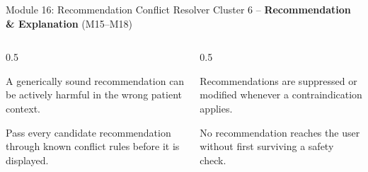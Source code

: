 \documentclass[9pt,aspectratio=169]{beamer}
\begin{document}
\begin{frame}{Module 16: Recommendation Conflict Resolver}
\textcolor{black!55}{\scriptsize Cluster 6 -- \textcolor{green!60!black}{\textbf{Recommendation \& Explanation}} (M15--M18)}\\[2pt]
\begin{columns}[T,onlytextwidth]
\begin{column}{0.5\textwidth}
\begin{tcolorbox}[colback=blue!7,colframe=blue!55!black,title=\textbf{Motivation},boxrule=0.6pt,arc=1mm,left=5pt,right=5pt,top=3pt,bottom=3pt,fonttitle=\small]
\footnotesize A generically sound recommendation can be actively harmful in the wrong patient context.
\end{tcolorbox}
\vspace{5pt}
\begin{tcolorbox}[colback=teal!7,colframe=teal!55!black,title=\textbf{Method},boxrule=0.6pt,arc=1mm,left=5pt,right=5pt,top=3pt,bottom=3pt,fonttitle=\small]
\footnotesize Pass every candidate recommendation through known conflict rules before it is displayed.
\end{tcolorbox}
\end{column}
\begin{column}{0.5\textwidth}
\begin{tcolorbox}[colback=green!8,colframe=green!45!black,title=\textbf{Result},boxrule=0.6pt,arc=1mm,left=5pt,right=5pt,top=3pt,bottom=3pt,fonttitle=\small]
\footnotesize Recommendations are suppressed or modified whenever a contraindication applies.
\end{tcolorbox}
\vspace{5pt}
\begin{tcolorbox}[colback=orange!10,colframe=orange!65!black,title=\textbf{Conclusion},boxrule=0.6pt,arc=1mm,left=5pt,right=5pt,top=3pt,bottom=3pt,fonttitle=\small]
\footnotesize No recommendation reaches the user without first surviving a safety check.
\end{tcolorbox}
\end{column}
\end{columns}
\end{frame}
\end{document}
